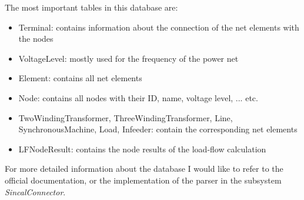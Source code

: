 The most important tables in this database are:
\begin{itemize}
	\item Terminal: contains information about the connection of the net elements with the nodes
	\item VoltageLevel: mostly used for the frequency of the power net
	\item Element: contains all net elements
	\item Node: contains all nodes with their ID, name, voltage level, ... etc.
	\item TwoWindingTransformer, ThreeWindingTransformer, Line, SynchronousMachine, Load, Infeeder: contain the corresponding net elements
	\item LFNodeResult: contains the node results of the load-flow calculation
\end{itemize}

For more detailed information about the database I would like to refer to the official documentation, or the implementation of the parser in the subsystem \emph{SincalConnector}.